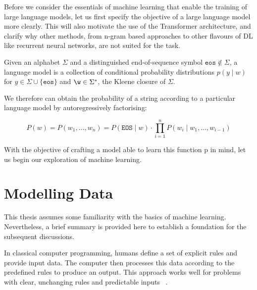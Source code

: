 \documentclass[a4paper, oneside]{discothesis}
\begin{document}
Before we consider the essentials of machine learning that enable the training of large language models, let us first specify the objective of a large language model more clearly. 
This will also motivate the use of the Transformer architecture, and clarify why other methods, from n-gram based approaches to other flavours of DL like recurrent neural networks, are not suited for the task.

\begin{theorem} \label{thm:first theorem}
    Given an alphabet $\Sigma$ and a distinguished end-of-sequence symbol $\texttt{eos} \notin \Sigma$, a
    language model is a collection of conditional probability distributions $p(y \mid w)$ for $y \in \Sigma \cup \{\texttt{eos}\}$ and $\w \in \Sigma^*$,
    the Kleene closure of $\Sigma$.
\end{theorem}

We therefore can obtain the probability of a string according to a particular language model by autoregressively factorising:

\begin{equation}
    P(w) = P(w_1, \ldots, w_n) =  P(\texttt{EOS} \mid w) \cdot \prod_{i=1}^n P(w_i \mid w_1, \ldots, w_{i-1}) 
\end{equation}

With the objective of crafting a model able to learn this function p in mind, let us begin our exploration of machine learning. 

\section{Modelling Data}

This thesis assumes some familiarity with the basics of machine learning. Nevertheless, a brief summary is provided here to establish a foundation for the subsequent discussions.

In classical computer programming, humans define a set of explicit rules and provide input data. The computer then processes this data according to the predefined rules to produce an output. 
This approach works well for problems with clear, unchanging rules and predictable inputs ~\cite{russell2010artificial}.
\end{document}
